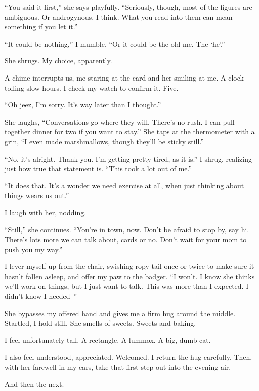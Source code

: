 ``You said it first,'' she says playfully. ``Seriously, though, most of
the figures are ambiguous. Or androgynous, I think. What you read into
them can mean something if you let it.''

``It could be nothing,'' I mumble. ``Or it could be the old me. The
`he'.''

She shrugs. My choice, apparently.

A chime interrupts us, me staring at the card and her smiling at me. A
clock tolling slow hours. I check my watch to confirm it. Five.

``Oh jeez, I'm sorry. It's way later than I thought.''

She laughs, ``Conversations go where they will. There's no rush. I can
pull together dinner for two if you want to stay.'' She taps at the
thermometer with a grin, ``I even made marshmallows, though they'll be
sticky still.''

``No, it's alright. Thank you. I'm getting pretty tired, as it is.'' I
shrug, realizing just how true that statement is. ``This took a lot out
of me.''

``It does that. It's a wonder we need exercise at all, when just
thinking about things wears us out.''

I laugh with her, nodding.

``Still,'' she continues. ``You're in town, now. Don't be afraid to stop
by, say hi. There's lots more we can talk about, cards or no. Don't wait
for your mom to push you my way.''

I lever myself up from the chair, swishing ropy tail once or twice to
make sure it hasn't fallen asleep, and offer my paw to the badger. ``I
won't. I know she thinks we'll work on things, but I just want to talk.
This was more than I expected. I didn't know I needed--''

She bypasses my offered hand and gives me a firm hug around the middle.
Startled, I hold still. She smells of sweets. Sweets and baking.

I feel unfortunately tall. A rectangle. A lummox. A big, dumb cat.

I also feel understood, appreciated. Welcomed. I return the hug
carefully. Then, with her farewell in my ears, take that first step out
into the evening air.

And then the next.
